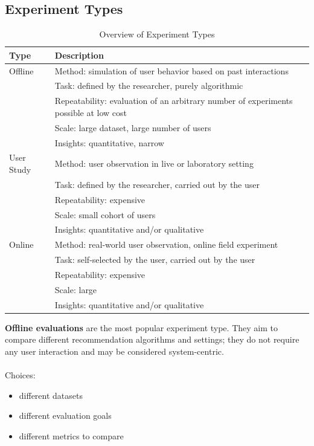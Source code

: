 \documentclass[\myFontSize,oneside,english,hidelinks,a4paper]{article}
\begin{document}
\subsection{Experiment Types}
\begin{table}[h!]
\centering
\begin{tabular}{p{3cm}|p{10cm}}
\hline
\textbf{Type} & \textbf{Description} \\
\hline
Offline & Method: simulation of user behavior based on past interactions \\
        & Task: defined by the researcher, purely algorithmic \\
        & Repeatability: evaluation of an arbitrary number of experiments possible at low cost \\
        & Scale: large dataset, large number of users \\
        & Insights: quantitative, narrow \\
\hline
User Study & Method: user observation in live or laboratory setting \\
           & Task: defined by the researcher, carried out by the user \\
           & Repeatability: expensive \\
           & Scale: small cohort of users \\
           & Insights: quantitative and/or qualitative \\
\hline
Online & Method: real-world user observation, online field experiment \\
       & Task: self-selected by the user, carried out by the user \\
       & Repeatability: expensive \\
       & Scale: large \\
       & Insights: quantitative and/or qualitative \\
\hline
\end{tabular}
\caption{Overview of Experiment Types \cite{Zangerle2023}}
\end{table}
%
%
\textbf{Offline evaluations} are the most popular experiment type. They aim to compare different recommendation algorithms and settings; they do not require any user interaction and may be considered
system-centric.  \cite{Zangerle2023}\\\\
%
%
Choices:
\begin{itemize}
\item different datasets
\item different evaluation goals
\item different metrics to compare
\end{itemize}
\end{document}
